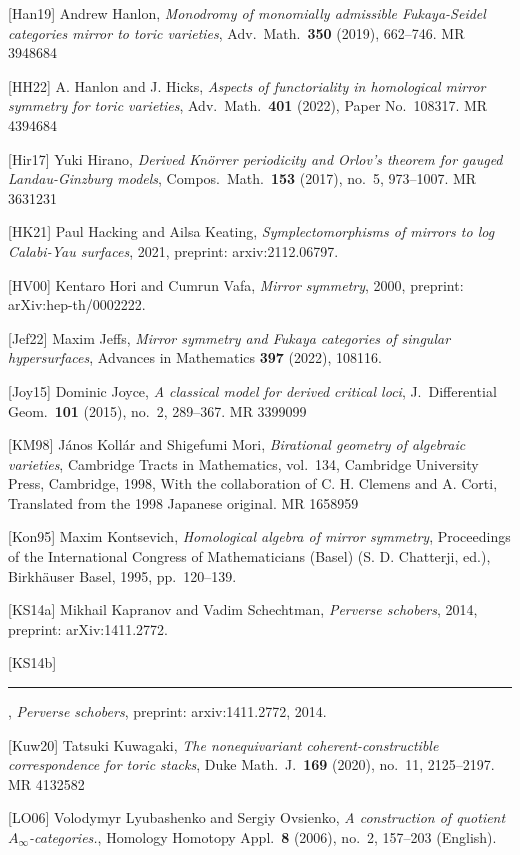 [Han19] Andrew Hanlon, \emph{Monodromy of monomially admissible Fukaya-Seidel categories
mirror to toric varieties}, Adv.\ Math.\ \textbf{350} (2019), 662--746. MR 3948684

[HH22] A. Hanlon and J. Hicks, \emph{Aspects of functoriality in homological mirror
symmetry for toric varieties}, Adv.\ Math.\ \textbf{401} (2022), Paper No.~108317.
MR 4394684

[Hir17] Yuki Hirano, \emph{Derived Kn{\"o}rrer periodicity and Orlov's theorem for
gauged Landau-Ginzburg models}, Compos.\ Math.\ \textbf{153} (2017), no.~5, 973--1007.
MR 3631231

[HK21] Paul Hacking and Ailsa Keating, \emph{Symplectomorphisms of mirrors to log
Calabi-Yau surfaces}, 2021, preprint: arxiv:2112.06797.

[HV00] Kentaro Hori and Cumrun Vafa, \emph{Mirror symmetry}, 2000, preprint:
arXiv:hep-th/0002222.

[Jef22] Maxim Jeffs, \emph{Mirror symmetry and Fukaya categories of singular
hypersurfaces}, Advances in Mathematics \textbf{397} (2022), 108116.

[Joy15] Dominic Joyce, \emph{A classical model for derived critical loci}, J.\
Differential Geom.\ \textbf{101} (2015), no.~2, 289--367. MR 3399099

[KM98] J{\'a}nos Koll{\'a}r and Shigefumi Mori, \emph{Birational geometry of algebraic
varieties}, Cambridge Tracts in Mathematics, vol.~134, Cambridge University Press,
Cambridge, 1998, With the collaboration of C. H. Clemens and A. Corti, Translated from
the 1998 Japanese original. MR 1658959


[Kon95] Maxim Kontsevich, \emph{Homological algebra of mirror symmetry}, Proceedings of
the International Congress of Mathematicians (Basel) (S. D. Chatterji, ed.),
Birkh{\"a}user Basel, 1995, pp.~120--139.

[KS14a] Mikhail Kapranov and Vadim Schechtman, \emph{Perverse schobers}, 2014, preprint:
arXiv:1411.2772.

[KS14b] \rule[0.4ex]{2.6em}{0.4pt} , \emph{Perverse schobers}, preprint:
arxiv:1411.2772, 2014.

[Kuw20] Tatsuki Kuwagaki, \emph{The nonequivariant coherent-constructible correspondence
for toric stacks}, Duke Math.\ J.\ \textbf{169} (2020), no.~11, 2125--2197. MR 4132582

[LO06] Volodymyr Lyubashenko and Sergiy Ovsienko, \emph{A construction of quotient
$A_\infty$-categories.}, Homology Homotopy Appl.\ \textbf{8} (2006), no.~2, 157--203
(English).

